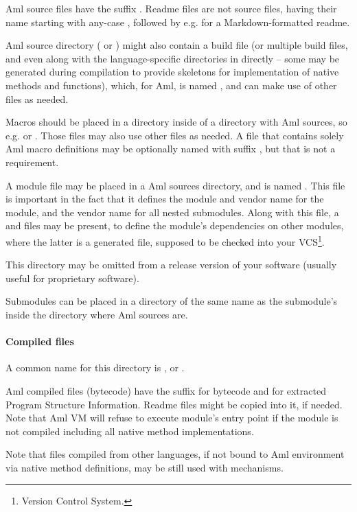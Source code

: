 Aml source files have the suffix . Readme files are not source files, having their name starting with any-case , followed by e.g.  for a Markdown-formatted readme. 

Aml source directory ( or ) might also contain a build file (or multiple build files, and even along with the language-specific directories in  directly -- some may be generated during compilation to provide skeletons for implementation of native methods and functions), which, for Aml, is named , and can make use of other files as needed. 

Macros should be placed in a  directory inside of a directory with Aml sources, so e.g.  or . Those files may also use other files as needed. A file that contains solely Aml macro definitions may be optionally named with suffix , but that is not a requirement. 

A module file may be placed in a Aml sources directory, and is named . This file is important in the fact that it defines the module and vendor name for the module, and the vendor name for all nested submodules. Along with this file, a  and  files may be present, to define the module's dependencies on other modules, where the latter is a generated file, supposed to be checked into your VCS\footnote{Version Control System.}.

This directory may be omitted from a release version of your software (usually useful for proprietary software). 

Submodules can be placed in a directory of the same name as the submodule's inside the directory where Aml sources are. 

\paragraph{Compiled files}
A common name for this directory is , or .

Aml compiled files (bytecode) have the suffix  for bytecode and  for extracted Program Structure Information. Readme files might be copied into it, if needed. Note that Aml VM will refuse to execute module's entry point if the module is not compiled including all native method implementations. 

Note that files compiled from other languages, if not bound to Aml environment via native method definitions, may be still used with  mechanisms. 

